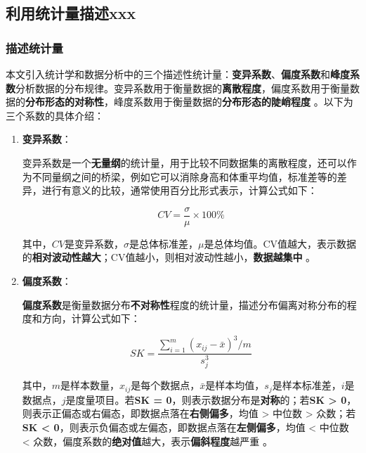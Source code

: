 \documentclass{article}
\begin{document}
	\subsection{利用统计量描述xxx}
	
	\subsubsection{描述统计量}
	
	本文引入统计学和数据分析中的三个描述性统计量：\textbf{变异系数}、\textbf{偏度系数}和\textbf{峰度系数}分析数据的分布规律。变异系数用于衡量数据的\textbf{离散程度}，偏度系数用于衡量数据的\textbf{分布形态的对称性}，峰度系数用于衡量数据的\textbf{分布形态的陡峭程度} \cite{1}。以下为三个系数的具体介绍：
	
	\begin{enumerate}
		\item \textbf{变异系数}：
		
		变异系数是一个\textbf{无量纲}的统计量，用于比较不同数据集的离散程度，还可以作为不同量纲之间的桥梁，例如它可以消除身高和体重平均值，标准差等的差异，进行有意义的比较，通常使用百分比形式表示，计算公式如下：
		
		\begin{equation}
			CV = \frac{\sigma}{\mu}\times100\%
			\label{eq:cv}
		\end{equation}
		
		其中，\(CV\)是变异系数，\(\sigma\)是总体标准差，\(\mu\)是总体均值。CV值越大，表示数据的\textbf{相对波动性越大}；CV值越小，则相对波动性越小，\textbf{数据越集中} \cite{2}。
		
		\item \textbf{偏度系数}：
		
		\textbf{偏度系数}是衡量数据分布\textbf{不对称性}程度的统计量，描述分布偏离对称分布的程度和方向，计算公式如下：
		
		\begin{equation}
			SK = \frac{\sum_{i=1}^{m} (x_{ij} - \bar{x})^3 / m}{s_j^3}
			\label{eq:sk}
		\end{equation}
		
		其中，\(m\)是样本数量，\(x_{ij}\)是每个数据点，\(\bar{x}\)是样本均值，\(s_j\)是样本标准差，\(i\)是数据点，\(j\)是度量项目。若\textbf{SK = 0}，则表示数据分布是\textbf{对称}的；若\textbf{SK > 0}，则表示正偏态或右偏态，即数据点落在\textbf{右侧偏多}，均值 > 中位数 > 众数；若\textbf{SK < 0}，则表示负偏态或左偏态，即数据点落在\textbf{左侧偏多}，均值 < 中位数 < 众数，偏度系数的\textbf{绝对值}越大，表示\textbf{偏斜程度}越严重 \cite{3}。
		

\end{enumerate}
\end{document}
